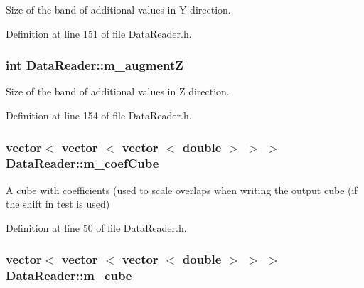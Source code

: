 Size of the band of additional values in Y direction. 



Definition at line 151 of file Data\+Reader.\+h.

\subsubsection[{\texorpdfstring{m\+\_\+augmentZ}{m_augmentZ}}]{\setlength{\rightskip}{0pt plus 5cm}int Data\+Reader\+::m\+\_\+augmentZ\hspace{0.3cm}{\ttfamily [private]}}\hypertarget{classDataReader_a71318eba05d2c7dbf8ac6bd804f5d5da}{}\label{classDataReader_a71318eba05d2c7dbf8ac6bd804f5d5da}


Size of the band of additional values in Z direction. 



Definition at line 154 of file Data\+Reader.\+h.

\subsubsection[{\texorpdfstring{m\+\_\+coef\+Cube}{m_coefCube}}]{\setlength{\rightskip}{0pt plus 5cm}vector$<$ vector $<$ vector $<$ double $>$ $>$ $>$ Data\+Reader\+::m\+\_\+coef\+Cube\hspace{0.3cm}{\ttfamily [private]}}\hypertarget{classDataReader_a27c2e4c67ca778cb720a3d56beb8ee7f}{}\label{classDataReader_a27c2e4c67ca778cb720a3d56beb8ee7f}
A cube with coefficients (used to scale overlaps when writing the output cube (if the shift in test is used) 

Definition at line 50 of file Data\+Reader.\+h.

\subsubsection[{\texorpdfstring{m\+\_\+cube}{m_cube}}]{\setlength{\rightskip}{0pt plus 5cm}vector$<$ vector $<$ vector $<$ double $>$ $>$ $>$ Data\+Reader\+::m\+\_\+cube\hspace{0.3cm}{\ttfamily [private]}}\hypertarget{classDataReader_a0a9bb36b0b16402e27008f4327e1bb92}{}\label{classDataReader_a0a9bb36b0b16402e27008f4327e1bb92}


